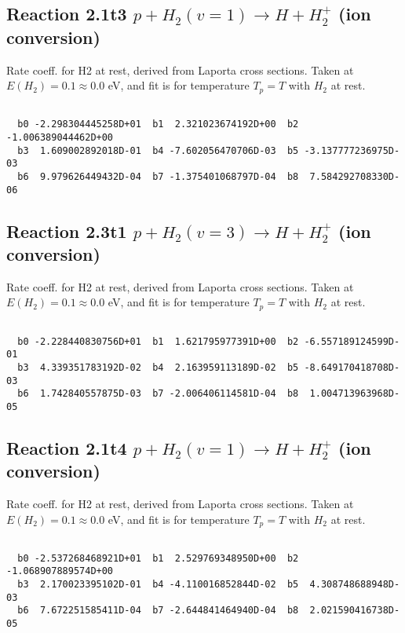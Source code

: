 \documentclass[12pt,dvipdfmx]{article}
\begin{document}
\newpage
\subsection{
Reaction 2.1t3
$ p + H_2(v=1) \rightarrow H + H_2^+$ (ion conversion)
}
Rate coeff. for H2 at rest, derived from Laporta cross sections.
Taken at $E(H_2) = 0.1 \approx 0.0$ eV,  and fit is for temperature $T_p=T$ with $H_2$ at rest.

\begin{small}\begin{verbatim}

  b0 -2.298304445258D+01  b1  2.321023674192D+00  b2 -1.006389044462D+00
  b3  1.609002892018D-01  b4 -7.602056470706D-03  b5 -3.137777236975D-03
  b6  9.979626449432D-04  b7 -1.375401068797D-04  b8  7.584292708330D-06

\end{verbatim}\end{small}

\newpage
\subsection{
Reaction 2.3t1
$ p + H_2(v=3) \rightarrow H + H_2^+$ (ion conversion)
}
Rate coeff. for H2 at rest, derived from Laporta cross sections.
Taken at $E(H_2) = 0.1 \approx 0.0$ eV,  and fit is for temperature $T_p=T$ with $H_2$ at rest.

\begin{small}\begin{verbatim}

  b0 -2.228440830756D+01  b1  1.621795977391D+00  b2 -6.557189124599D-01
  b3  4.339351783192D-02  b4  2.163959113189D-02  b5 -8.649170418708D-03
  b6  1.742840557875D-03  b7 -2.006406114581D-04  b8  1.004713963968D-05

\end{verbatim}\end{small}

\newpage
\subsection{
Reaction 2.1t4
$ p + H_2(v=1) \rightarrow H + H_2^+$ (ion conversion)
}
Rate coeff. for H2 at rest, derived from Laporta cross sections.
Taken at $E(H_2) = 0.1 \approx 0.0$ eV,  and fit is for temperature $T_p=T$ with $H_2$ at rest.

\begin{small}\begin{verbatim}

  b0 -2.537268468921D+01  b1  2.529769348950D+00  b2 -1.068907889574D+00
  b3  2.170023395102D-01  b4 -4.110016852844D-02  b5  4.308748688948D-03
  b6  7.672251585411D-04  b7 -2.644841464940D-04  b8  2.021590416738D-05

\end{verbatim}\end{small}
\end{document}
